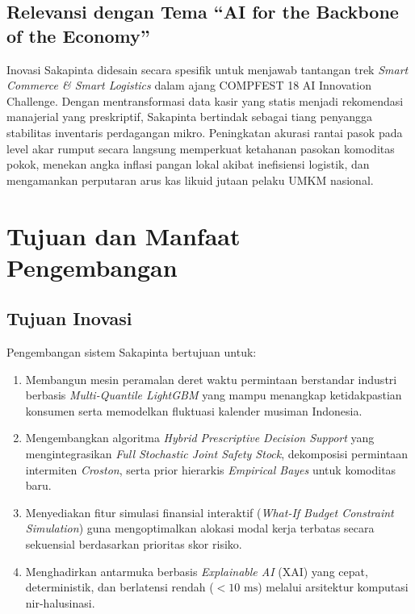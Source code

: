 \documentclass[12pt,a4paper]{article}
\begin{document}
\subsection{Relevansi dengan Tema ``AI for the Backbone of the Economy''}
Inovasi Sakapinta didesain secara spesifik untuk menjawab tantangan trek \textit{Smart Commerce \& Smart Logistics} dalam ajang COMPFEST 18 AI Innovation Challenge. Dengan mentransformasi data kasir yang statis menjadi rekomendasi manajerial yang preskriptif, Sakapinta bertindak sebagai tiang penyangga stabilitas inventaris perdagangan mikro. Peningkatan akurasi rantai pasok pada level akar rumput secara langsung memperkuat ketahanan pasokan komoditas pokok, menekan angka inflasi pangan lokal akibat inefisiensi logistik, dan mengamankan perputaran arus kas likuid jutaan pelaku UMKM nasional.

\section{Tujuan dan Manfaat Pengembangan}

\subsection{Tujuan Inovasi}
Pengembangan sistem Sakapinta bertujuan untuk:
\begin{enumerate}
    \item Membangun mesin peramalan deret waktu permintaan berstandar industri berbasis \textit{Multi-Quantile LightGBM} yang mampu menangkap ketidakpastian konsumen serta memodelkan fluktuasi kalender musiman Indonesia.
    \item Mengembangkan algoritma \textit{Hybrid Prescriptive Decision Support} yang mengintegrasikan \textit{Full Stochastic Joint Safety Stock}, dekomposisi permintaan intermiten \textit{Croston}, serta prior hierarkis \textit{Empirical Bayes} untuk komoditas baru.
    \item Menyediakan fitur simulasi finansial interaktif (\textit{What-If Budget Constraint Simulation}) guna mengoptimalkan alokasi modal kerja terbatas secara sekuensial berdasarkan prioritas skor risiko.
    \item Menghadirkan antarmuka berbasis \textit{Explainable AI} (XAI) yang cepat, deterministik, dan berlatensi rendah ($<10\text{ ms}$) melalui arsitektur komputasi nir-halusinasi.
\end{enumerate}
\end{document}
